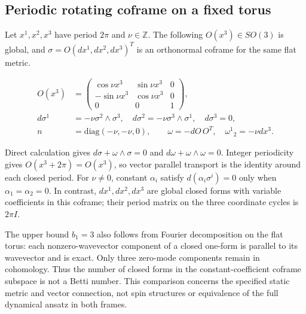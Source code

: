 \subsection{Periodic rotating coframe on a fixed torus}

Let $x^1,x^2,x^3$ have period $2\pi$ and $\nu\in\mathbb Z$. The following $O(x^3)\in SO(3)$ is global, and $\sigma=O(dx^1,dx^2,dx^3)^T$ is an orthonormal coframe for the same flat metric.

\begin{equation}\tag{F-01}\label{eq:F-01}
\begin{aligned}
O(x^3)&=\begin{pmatrix}\cos\nu x^3&\sin\nu x^3&0\\-\sin\nu x^3&\cos\nu x^3&0\\0&0&1\end{pmatrix},\\
d\sigma^1&=-\nu\sigma^2\wedge\sigma^3,\quad
d\sigma^2=-\nu\sigma^3\wedge\sigma^1,\quad d\sigma^3=0,\\
n&=\mathrm{diag}(-\nu,-\nu,0),\qquad
\omega=-dO\,O^T,\quad \omega^1{}_2=-\nu dx^3.
\end{aligned}
\end{equation}

Direct calculation gives $d\sigma+\omega\wedge\sigma=0$ and $d\omega+\omega\wedge\omega=0$. Integer periodicity gives $O(x^3+2\pi)=O(x^3)$, so vector parallel transport is the identity around each closed period. For $\nu\ne0$, constant $\alpha_i$ satisfy $d(\alpha_i\sigma^i)=0$ only when $\alpha_1=\alpha_2=0$. In contrast, $dx^1,dx^2,dx^3$ are global closed forms with variable coefficients in this coframe; their period matrix on the three coordinate cycles is $2\pi I$.

The upper bound $b_1=3$ also follows from Fourier decomposition on the flat torus: each nonzero-wavevector component of a closed one-form is parallel to its wavevector and is exact. Only three zero-mode components remain in cohomology. Thus the number of closed forms in the constant-coefficient coframe subspace is not a Betti number. This comparison concerns the specified static metric and vector connection, not spin structures or equivalence of the full dynamical ansatz in both frames.
